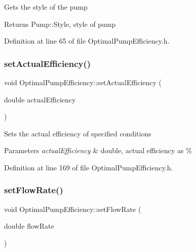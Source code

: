 Gets the style of the pump \begin{DoxyReturn}{Returns}
Pump\+::\+Style, style of pump 
\end{DoxyReturn}


Definition at line 65 of file Optimal\+Pump\+Efficiency.\+h.

\mbox{\label{class_optimal_pump_efficiency_a539b20c53c7ba6a5983a60d74be4ac9e}} 
\subsubsection{\texorpdfstring{set\+Actual\+Efficiency()}{setActualEfficiency()}}
{\footnotesize\ttfamily void Optimal\+Pump\+Efficiency\+::set\+Actual\+Efficiency (\begin{DoxyParamCaption}\item[{double}]{actual\+Efficiency }\end{DoxyParamCaption})\hspace{0.3cm}{\ttfamily [inline]}}

Sets the actual efficiency of specified conditions 
\begin{DoxyParams}{Parameters}
{\em actual\+Efficiency} & double, actual efficiency as \% \\
\hline
\end{DoxyParams}


Definition at line 169 of file Optimal\+Pump\+Efficiency.\+h.

\mbox{\label{class_optimal_pump_efficiency_a90067b57c559fd3274fb8d6e00f6221d}} 
\subsubsection{\texorpdfstring{set\+Flow\+Rate()}{setFlowRate()}}
{\footnotesize\ttfamily void Optimal\+Pump\+Efficiency\+::set\+Flow\+Rate (\begin{DoxyParamCaption}\item[{double}]{flow\+Rate }\end{DoxyParamCaption})\hspace{0.3cm}{\ttfamily [inline]}}

